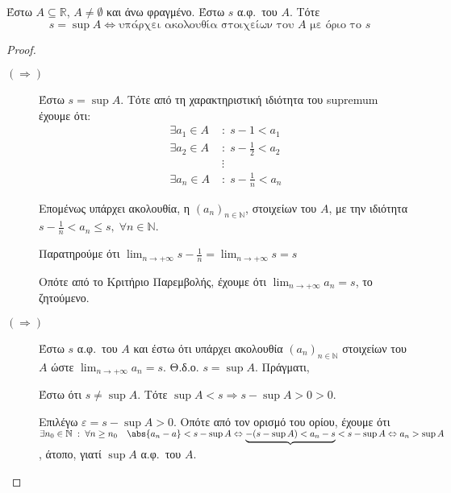 \begin{mythmbox}
  Έστω $ A \subseteq \mathbb{R} $, $ A \neq \emptyset $ και άνω φραγμένο. 
  Έστω $ s $ α.φ.\ του $A$. Τότε 
  \[
    s = \sup A \Leftrightarrow \text{υπάρχει ακολουθία στοιχείων του $A$ με όριο το $s$} 
  \]
\end{mythmbox}
\begin{proof}
\item {}
  \begin{description}
    \item [$ (\Rightarrow) $]
      Έστω $ s = \sup A $. Τότε από τη χαρακτηριστική ιδιότητα του supremum έχουμε ότι:
      \begin{align*}
        \exists a_{1} \in A \; &: \; s - 1 < a_{1} \\
        \exists a_{2} \in A \; &: \; s - \frac{1}{2}  < a_{2} \\
                               &\vdots \\
        \exists a_{n} \in A \; &: \; s - \frac{1}{n}  < a_{n} 
      \end{align*} 

      Επομένως υπάρχει ακολουθία, η $ (a_{n})_{n \in \mathbb{N}} $, στοιχείων του $A$, 
      με την ιδιότητα $ s - \frac{1}{n} < a_{n} \leq s, \; \forall n \in \mathbb{N}$. 

      Παρατηρούμε ότι $ \lim_{n \to +\infty} s- \frac{1}{n} = \lim_{n \to +\infty} s = s $ 

      Οπότε από το Κριτήριο Παρεμβολής, έχουμε ότι $ \lim_{n \to +\infty} a_{n}= s $, 
      το ζητούμενο.

    \item [$ (\Rightarrow) $]
      Έστω $ s $ α.φ.\ του $A$ και έστω ότι υπάρχει ακολουθία $ (a_{n})_{n \in \mathbb{N}} $ 
      στοιχείων του $A$ ώστε $ \lim_{n \to +\infty} a_{n}= s$. Θ.δ.ο. $ s = \sup A $. 
      Πράγματι, 

      Έστω ότι $ s \neq \sup A $. Τότε $ \sup A < s \Rightarrow s - \sup A > 0 > 0 $. 

      Επιλέγω $ \varepsilon = s - \sup A >0 $. Οπότε από τον ορισμό του ορίου, έχουμε ότι 
      $ \exists n_{0} \in \mathbb{N} \; : \; \forall n \geq n_{0} \quad \abs{a_{n} - a} < 
      s - \sup A \Leftrightarrow \underbrace{-(s - \sup A) < a_{n} - s} < s - \sup A 
      \Leftrightarrow a_{n} > \sup A$, άτοπο, γιατί $ \sup A $ α.φ.\ του $A$.
  \end{description}
\end{proof}

